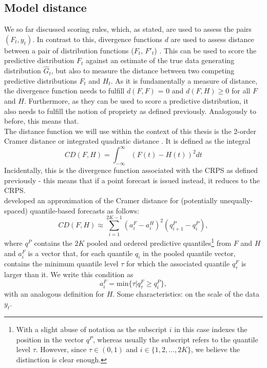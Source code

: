 \subsection{Model distance}
We so far discussed scoring rules, which, as stated, are used to assess the pairs $(F_t, y_t)$. In contrast to this, divergence functions $d$ are used to assess distance between a pair of distribution functions ($F_t$, $F'_t$) \cite{thorarinsdottir_using_2013}. This can be used to score the predictive distribution $F_t$ against an estimate of the true data generating distribution $\hat{G}_t$, but also to measure the distance between two competing predictive distributions $F_t$ and $H_t$. As it is fundamentally a measure of distance, the divergence function needs to fulfill $d(F,F)$ = 0 and $d(F,H)\geq 0$ for all $F$ and $H$. Furthermore, as they can be used to score a predictive distribution, it also needs to fulfill the notion of propriety as defined previously. Analogously to before, this means that. \\
The distance function we will use within the context of this thesis is the 2-order Cramer distance or integrated quadratic distance \cite{thorarinsdottir_using_2013}. It is defined as the integral
\begin{equation}
CD(F, H) = \int_{-\infty}^{\infty}\left(F(t) - H(t) \right)^2dt
\end{equation}
Incidentally, this is the divergence function associated with the CRPS as defined previously - this means that if a point forecast is issued instead, it reduces to the CRPS.\\
\cite{wang_covidhubutils_2022} developed an approximation of the Cramer distance for (potentially unequally-spaced) quantile-based forecasts as follows:
\begin{equation}
CD(F,H) \approx \sum_{i = 1}^{2K-1} (a_i^F - a_i^H)^2 (q_{i+1}^{P} - q_{i}^{P}),
\end{equation} 
where $q^P$ contains the $2K$ pooled and ordered predictive quantiles\footnote{With a slight abuse of notation as the subscript $i$ in this case indexes the position in the vector $q^P$, whereas usually the subscript refers to the quantile level $\tau$. However, since $\tau \in (0,1)$ and $i \in \{1,2,...,2K\}$, we believe the distinction is clear enough.} from $F$ and $H$ and $a_i^F$ is a vector that, for each quantile $q_i$ in the pooled quantile vector, contains the minimum quantile level $\tau$ for which the associated quantile $q_\tau^F$ is larger than it. We write this condition as
\begin{equation*}
a_i^F = \text{min}\{\tau | q_\tau^F \geq q_i^P\},
\end{equation*}
with an analogous definition for $H$.
Some characteristics: on the scale of the data $y_t$.\\

